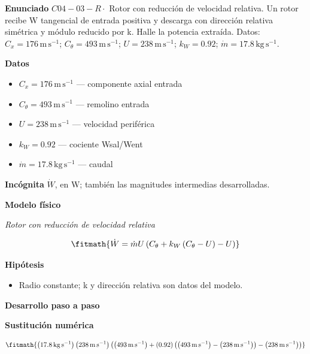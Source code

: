 \documentclass[10pt,openany]{book}
\begin{document}
\begin{tcolorbox}[title={Problema resuelto 3}, studiumworked, breakable]

\noindent\textbf{Enunciado}
\(C04-03-R \cdot\) Rotor con reducción de velocidad relativa. Un rotor recibe W tangencial de entrada positiva y descarga con dirección relativa simétrica y módulo reducido por k. Halle la potencia extraída. Datos: \(C_x=176\, \mathrm{m}\,\mathrm{s}^{-1}\); \(C_\theta=493\, \mathrm{m}\,\mathrm{s}^{-1}\); \(U=238\, \mathrm{m}\,\mathrm{s}^{-1}\); \(k_W=0.92\); \(\dot m=17.8\, \mathrm{kg}\,\mathrm{s}^{-1}\).

\noindent\textbf{Datos}
\begin{itemize}
\item $C_x = 176\,\mathrm{m}\,\mathrm{s}^{-1}$ — componente axial entrada
\item $C_\theta = 493\,\mathrm{m}\,\mathrm{s}^{-1}$ — remolino entrada
\item $U = 238\,\mathrm{m}\,\mathrm{s}^{-1}$ — velocidad periférica
\item $k_W = 0.92$ — cociente Wsal/Went
\item $\dot m = 17.8\,\mathrm{kg}\,\mathrm{s}^{-1}$ — caudal
\end{itemize}

\noindent\textbf{Incógnita}
$\dot{W}$, en $\mathrm{W}$; también las magnitudes intermedias desarrolladas.

\noindent\textbf{Modelo físico}

\noindent\textit{Rotor con reducción de velocidad relativa}

\[
\fitmath{\dot{W}=\dot m U \left(C_\theta + k_W \left(C_\theta - U\right) - U\right)}
\]

\noindent\textbf{Hipótesis}
\begin{itemize}
\item Radio constante; k y dirección relativa son datos del modelo.
\end{itemize}

\noindent\textbf{Desarrollo paso a paso}



\noindent\textbf{Sustitución numérica}

\[
\fitmath{\left(17.8\,\mathrm{kg}\,\mathrm{s}^{-1}\right) \left(238\,\mathrm{m}\,\mathrm{s}^{-1}\right) \left(\left(493\,\mathrm{m}\,\mathrm{s}^{-1}\right) + \left(0.92\right) \left(\left(493\,\mathrm{m}\,\mathrm{s}^{-1}\right) - \left(238\,\mathrm{m}\,\mathrm{s}^{-1}\right)\right) - \left(238\,\mathrm{m}\,\mathrm{s}^{-1}\right)\right)}
\]


\end{tcolorbox}
\end{document}
